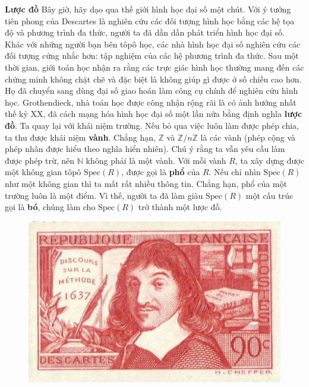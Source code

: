 \begin{multicols}{2}	
	\textbf{\color{duongvaotoanhoc}Lược đồ}
	\vskip 0.1cm
	Bây giờ, hãy dạo qua thế giới hình học đại số một chút. Với ý tưởng tiên phong của Descartes là nghiên cứu các đối tượng hình học bằng các hệ tọa độ và phương trình đa thức, người ta đã dần dần phát triển hình học đại số. Khác với những người bạn bên tôpô học, các nhà hình học đại số nghiên cứu các đối tượng cứng nhắc hơn: tập nghiệm của các hệ phương trình đa thức. Sau một thời gian, giới toán học nhận ra rằng các trực giác hình học thường mang đến các chứng minh không chặt chẽ và đặc biệt là không giúp gì được ở số chiều cao hơn. Họ đã chuyển sang dùng đại số giao hoán làm công cụ chính để nghiên cứu hình học. Grothendieck, nhà toán học được công nhận rộng rãi là có ảnh hưởng nhất thế kỷ XX, đã cách mạng hóa hình học đại số một lần nữa bằng định nghĩa {\bf\color{duongvaotoanhoc} lược đồ}.
	\vskip 0.1cm
	Ta quay lại với khái niệm trường. Nếu bỏ qua việc luôn làm được phép chia, ta thu được khái niệm {\bf\color{duongvaotoanhoc} vành}. Chẳng hạn, $\mathbb{Z}$ và $\mathbb{Z}/n\mathbb{Z}$ là các vành (phép cộng và phép nhân được hiểu theo nghĩa hiển nhiên). Chú ý rằng ta vẫn yêu cầu làm được phép trừ, nên $\mathbb{N}$ không phải là một vành. Với mỗi vành $R$, ta xây dựng được một không gian tôpô $\text{Spec}(R)$, được gọi là {\bf\color{duongvaotoanhoc} phổ} của $R$. Nếu chỉ nhìn $\text{Spec}(R)$ như một không gian thì ta mất rất nhiều thông tin. Chẳng hạn, phổ của một trường luôn là một điểm. Vì thế, người ta đã làm giàu $\text{Spec}(R)$ một cấu trúc gọi là {\bf\color{duongvaotoanhoc} bó}, chúng làm cho $\text{Spec}(R)$ trở thành một lược đồ.
	\begin{figure}[H]
		\vspace*{-5pt}
		\centering
		\captionsetup{labelformat= empty, justification=centering}
		\includegraphics[width= 1\linewidth]{Descartes}

\end{figure}
\end{multicols}
